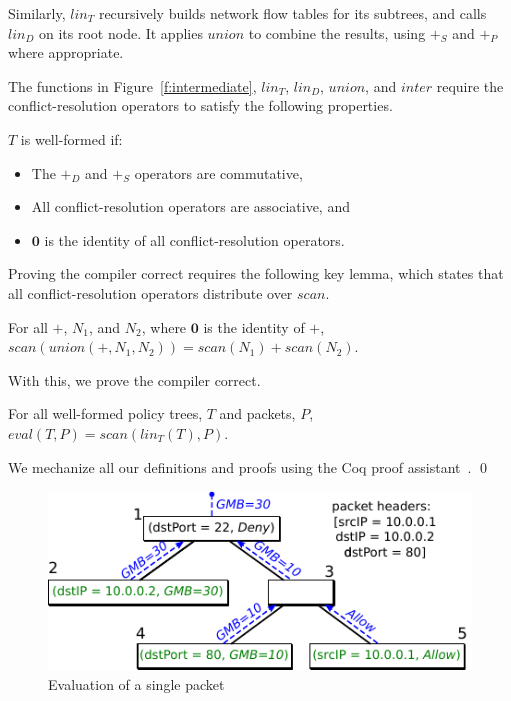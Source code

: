 Similarly, $\mathit{lin}_T$ recursively builds network flow tables for
its subtrees, and calls $\mathit{lin}_D$ on its root node.  It applies
$\mathit{union}$ to combine the results, using $+_S$ and $+_P$ where
appropriate.


The functions in Figure~\ref{f:intermediate}, $\mathit{lin}_T$,
$\mathit{lin}_D$, $\mathit{union}$, and $\mathit{inter}$ require the
conflict-resolution operators to satisfy the following properties.
\begin{wftree} 
$T$ is well-formed if:
\begin{itemize}

\item The $+_D$ and $+_S$ operators are commutative,

\item All conflict-resolution operators are associative, and

\item $\textbf{0}$ is the identity of all conflict-resolution operators.
\end{itemize}
\end{wftree}
Proving the compiler correct requires the following key lemma, which
states that all conflict-resolution operators distribute over $\mathit{scan}$.
\begin{unioncommute}
For all $+$, $N_1$, and $N_2$, where $\textbf{0}$ is the identity of $+$,
$\mathit{scan}(\mathit{union}(+,N_1,N_2)) = \mathit{scan}(N_1) +
\mathit{scan}(N_2)$.
\end{unioncommute}
With this, we prove the compiler correct.
\begin{compilercorrect}[Soundness]
For all well-formed policy trees, $T$ and packets, $P$, $\mathit{eval}(T, P) =
\mathit{scan}(\mathit{lin}_T(T), P)$.
\end{compilercorrect}
We mechanize all our definitions and proofs using the Coq proof assistant~\cite{coq}. \qed

\begin{figure}
\centering
\includegraphics{figs/evaltree}
\caption{Evaluation of a single packet}
\label{f:evaltree}
\end{figure}

